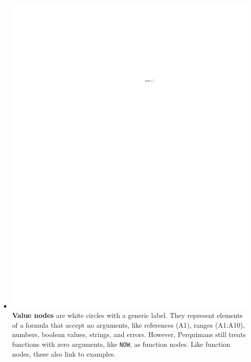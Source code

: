 \documentclass[conference]{IEEEtran}
\newcommand{\toolname}{Perquimans\xspace} \newcommand{\toolnameend}{Perquimans}
\begin{document}
\begin{itemize}
		\item \vspace{.25cm}\includegraphics{glossary-leaf} \textbf{Value nodes} are
		white circles with a generic label. They represent elements of a formula that
		accept no arguments, like references (A1), ranges (A1:A10), numbers, boolean
		values, strings, and errors. However, \toolname still treats functions with
		zero arguments, like \texttt{NOW}, as function nodes. Like function nodes,
		these also link to examples.
		

\end{itemize}
\end{document}
